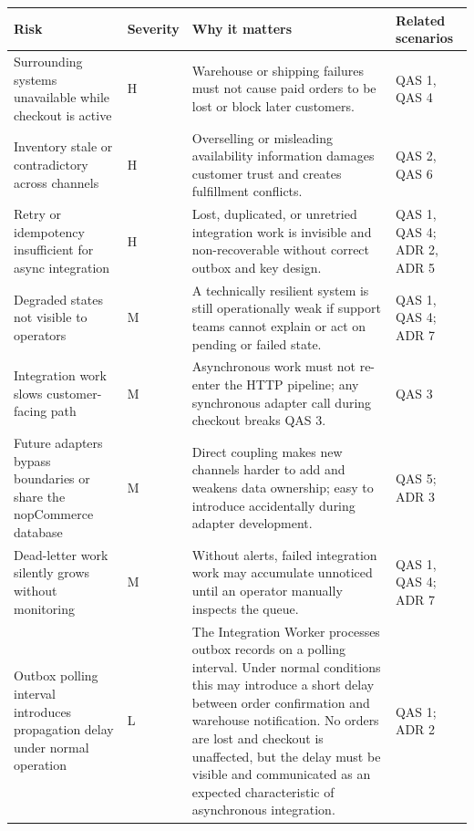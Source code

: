 \begingroup
\small
\setlength{\tabcolsep}{4pt}
\renewcommand{\arraystretch}{1.15}
\begin{center}
\begin{tabular}{|p{}|p{}|p{}|p{}|}
\hline
\textbf{Risk} & \textbf{Severity} & \textbf{Why it matters} & \textbf{Related scenarios} \\
\hline
Surrounding systems unavailable while checkout is active &
H &
Warehouse or shipping failures must not cause paid orders to be lost or block later customers. &
QAS 1, QAS 4 \\
\hline
Inventory stale or contradictory across channels &
H &
Overselling or misleading availability information damages customer trust and creates fulfillment conflicts. &
QAS 2, QAS 6 \\
\hline
Retry or idempotency insufficient for async integration &
H &
Lost, duplicated, or unretried integration work is invisible and non-recoverable without correct outbox and key design. &
QAS 1, QAS 4; ADR 2, ADR 5 \\
\hline
Degraded states not visible to operators &
M &
A technically resilient system is still operationally weak if support teams cannot explain or act on pending or failed state. &
QAS 1, QAS 4; ADR 7 \\
\hline
Integration work slows customer-facing path &
M &
Asynchronous work must not re-enter the HTTP pipeline; any synchronous adapter call during checkout breaks QAS 3. &
QAS 3 \\
\hline
Future adapters bypass boundaries or share the nopCommerce database &
M &
Direct coupling makes new channels harder to add and weakens data ownership; easy to introduce accidentally during adapter development. &
QAS 5; ADR 3 \\
\hline
Dead-letter work silently grows without monitoring &
M &
Without alerts, failed integration work may accumulate unnoticed until an operator manually inspects the queue. &
QAS 1, QAS 4; ADR 7 \\
\hline
Outbox polling interval introduces propagation delay under normal operation &
L &
The Integration Worker processes outbox records on a polling interval. Under normal conditions
this may introduce a short delay between order confirmation and warehouse notification. No
orders are lost and checkout is unaffected, but the delay must be visible and communicated as an
expected characteristic of asynchronous integration. &
QAS 1; ADR 2 \\
\hline
\end{tabular}
\end{center}
\endgroup

